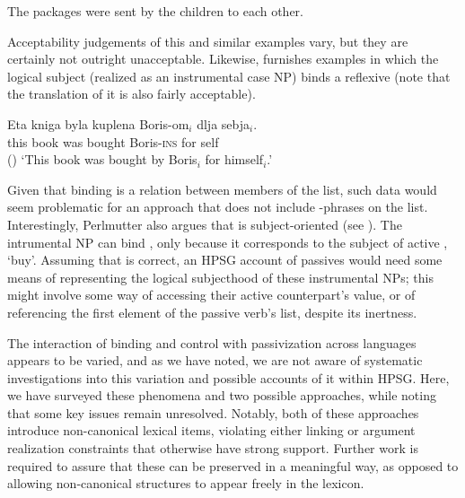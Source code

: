 \documentclass[output=paper,biblatex,babelshorthands,newtxmath,draftmode,colorlinks, citecolor=brown]{langscibook}
\begin{document}
\begin{exe}
\ex\label{by-bind}The packages were sent by the children to each other.
\end{exe} 

\noindent
Acceptability judgements of this and similar examples vary, but they are certainly not outright unacceptable.  Likewise, \citet[10]{Perlmutter1984} furnishes  examples in which the logical subject (realized as an instrumental case NP) binds a reflexive (note that the  translation of it is also fairly acceptable).

\begin{exe}
\ex     \label{arg-st:russian-pass}
\gll Eta kniga byla kuplena Boris-om$_{i}$ dlja sebja$_{i}$.  \\
     this book was bought Boris-\textsc{ins} for self  \\\hfill()
\glt `This book was bought by Boris$_{i}$ for himself$_{i}$.'
\end{exe}

\noindent
Given that binding is a relation between members of the \argst list, such data would seem problematic for an approach that does not include -phrases on the \argst list.
Interestingly, Perlmutter also argues that   is subject-oriented (see ).
The intrumental NP  can bind , only because it corresponds to the subject of active , `buy'.
Assuming that is correct, an HPSG account of  passives would need some means of representing the logical subjecthood of these instrumental NPs; this might involve some way of accessing their active counterpart's \subj value, or of referencing the first element of the passive verb's \argst list, despite its inertness.

The interaction of binding and control with passivization across languages appears to be varied, and as we have noted, we are not aware of systematic investigations into this variation and possible accounts of it within HPSG.
Here, we have surveyed these phenomena and two possible approaches, while noting that some key issues remain unresolved.
Notably, both of these approaches introduce non-canonical lexical items, violating either linking or argument realization constraints that otherwise have strong support. 
Further work is required to assure that these can be preserved in a meaningful way, as opposed to allowing non-canonical structures to appear freely in the lexicon.
\end{document}

